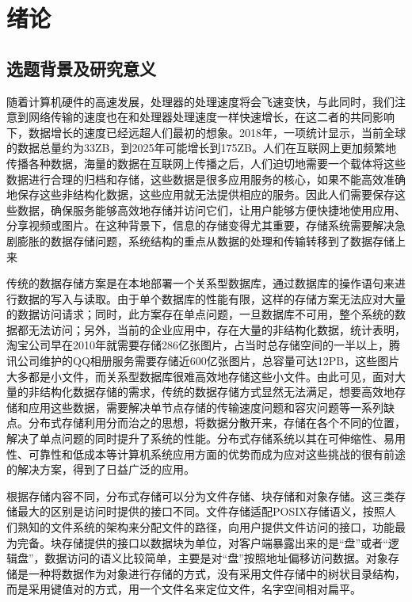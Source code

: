 
\chapter{绪论}

\section{选题背景及研究意义}%
随着计算机硬件的高速发展，处理器的处理速度将会飞速变快，与此同时，我们注意到网络传输的速度也在和处理器处理速度一样快速增长，在这二者的共同影响下，数据增长的速度已经远超人们最初的想象。2018年，一项统计显示，当前全球的数据总量约为33ZB，到2025年可能增长到175ZB\cite{2}。人们在互联网上更加频繁地传播各种数据，海量的数据在互联网上传播之后，人们迫切地需要一个载体将这些数据进行合理的归档和存储，这些数据是很多应用服务的核心，如果不能高效准确地保存这些非结构化数据，这些应用就无法提供相应的服务\cite{1}。因此人们需要保存这些数据，确保服务能够高效地存储并访问它们，让用户能够方便快捷地使用应用、分享视频或图片。在这种背景下，信息的存储变得尤其重要，存储系统需要解决急剧膨胀的数据存储问题，系统结构的重点从数据的处理和传输转移到了数据存储上来

传统的数据存储方案是在本地部署一个关系型数据库，通过数据库的操作语句来进行数据的写入与读取。由于单个数据库的性能有限，这样的存储方案无法应对大量的数据访问请求；同时，此方案存在单点问题，一旦数据库不可用，整个系统的数据都无法访问；另外，当前的企业应用中，存在大量的非结构化数据，统计表明，淘宝公司早在2010年就需要存储286亿张图片\cite{3}，占当时总存储空间的一半以上，腾讯公司维护的QQ相册服务需要存储近600亿张图片，总容量可达12PB\cite{4}，这些图片大多都是小文件，而关系型数据库很难高效地存储这些小文件。由此可见，面对大量的非结构化数据存储的需求，传统的数据存储方式显然无法满足，想要高效地存储和应用这些数据，需要解决单节点存储的传输速度问题和容灾问题等一系列缺点\cite{5}。分布式存储利用分而治之的思想，将数据分散开来，存储在各个不同的位置，解决了单点问题的同时提升了系统的性能。分布式存储系统以其在可伸缩性、易用性、可靠性和低成本等计算机系统应用方面的优势而成为应对这些挑战的很有前途的解决方案，得到了日益广泛的应用\cite{6}。


根据存储内容不同，分布式存储可以分为文件存储、块存储和对象存储。这三类存储最大的区别是访问时提供的接口不同。文件存储适配POSIX存储语义，按照人们熟知的文件系统的架构来分配文件的路径，向用户提供文件访问的接口，功能最为完备。块存储提供的接口以数据块为单位，对客户端暴露出来的是“盘”或者“逻辑盘”，数据访问的语义比较简单，主要是对“盘”按照地址偏移访问数据。对象存储是一种将数据作为对象进行存储的方式，没有采用文件存储中的树状目录结构，而是采用键值对的方式，用一个文件名来定位文件，名字空间相对扁平。

